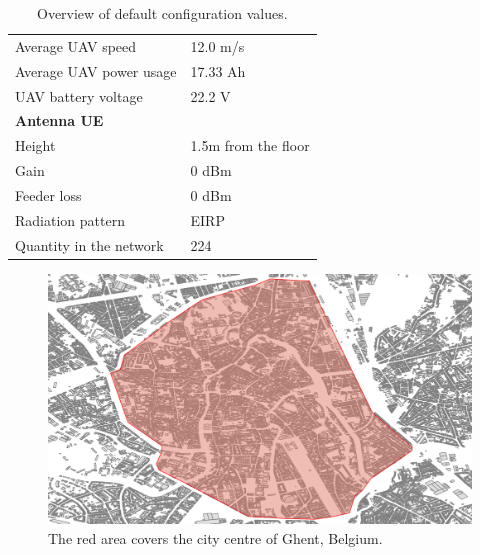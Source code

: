 \begin{table}[!htb]
\begin{tabular}[t]{ll}
        \hspace{3mm}  Average UAV speed                   & 12.0 m/s \\
        \hspace{3mm}  Average UAV power usage             & 17.33 Ah    \\
        \hspace{3mm}  UAV battery voltage                 & 22.2 V \\
        \hline
        \multicolumn{2}{l}{\textbf{Antenna \acs{UE}}} \\
        \hline 
        \hspace{3mm} Height                     & 1.5m from the floor       \\ 
        \hspace{3mm} Gain                      & 0 dBm   \\ 
        \hspace{3mm} Feeder loss               & 0 dBm   \\ 
        \hspace{3mm} Radiation pattern         & \acs{EIRP}  \\
        \hspace{3mm} Quantity in the network                & 224  \\
        \toprule
\end{tabular}
\caption{Overview of default configuration values.}
\label{table:defaultconf}
\end{table}

\begin{figure}[!h]
  \includegraphics[width=\textwidth]{../images/cityCenterGhent.png}
\caption{The red area covers the city centre of Ghent, Belgium.}
  \label{fig:ghent}
\end{figure}
